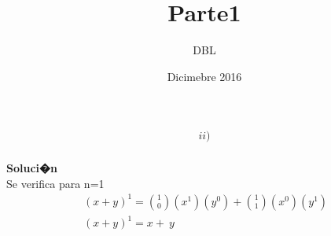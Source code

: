 \documentclass{article}
\title{Parte1}
\author{DBL }
\date{Dicimebre 2016}
\begin{document}
\maketitle

\begin{enumerate}
    \begin{gather*}
         ii)
    \end{gather*}
    \\\textbf{Soluci�n}\\Se verifica para n=1
    \begin{gather*}
        \ (x+y)^1 =   \binom{1}{0}(x^1)(y^0) + \binom{1}{1}(x^0)(y^1)\\
        \ (x+y)^1 =   x +\ y
    \end{gather*}\\
        

\end{enumerate}
\end{document}
